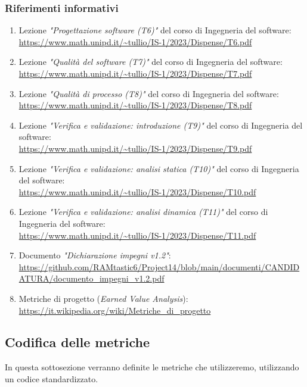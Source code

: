 \subsubsection{Riferimenti informativi}
\label{sec:rif_inf}
\begin{enumerate}
    \item Lezione \emph{"Progettazione software (T6)"} del corso di Ingegneria del software: \\
    \url{https://www.math.unipd.it/~tullio/IS-1/2023/Dispense/T6.pdf}
    \item Lezione \emph{"Qualità del software (T7)"} del corso di Ingegneria del software: \\
    \url{https://www.math.unipd.it/~tullio/IS-1/2023/Dispense/T7.pdf}
    \item Lezione \emph{"Qualità di processo (T8)"} del corso di Ingegneria del software: \\
    \url{https://www.math.unipd.it/~tullio/IS-1/2023/Dispense/T8.pdf}
    \item Lezione \emph{"Verifica e validazione: introduzione (T9)"} del corso di Ingegneria del software: \\
    \url{https://www.math.unipd.it/~tullio/IS-1/2023/Dispense/T9.pdf}
    \item Lezione \emph{"Verifica e validazione: analisi statica (T10)"} del corso di Ingegneria del software: \\
    \url{https://www.math.unipd.it/~tullio/IS-1/2023/Dispense/T10.pdf}
    \item Lezione \emph{"Verifica e validazione: analisi dinamica (T11)"} del corso di Ingegneria del software: \\
    \url{https://www.math.unipd.it/~tullio/IS-1/2023/Dispense/T11.pdf}
     \item Documento \emph{"Dichiarazione impegni v1.2"}: \\ \url{https://github.com/RAMtastic6/Project14/blob/main/documenti/CANDIDATURA/documento_impegni_v1.2.pdf}
     \item Metriche di progetto (\emph{Earned Value Analysis}):\\
     \url{https://it.wikipedia.org/wiki/Metriche_di_progetto}
\end{enumerate}
\subsection{Codifica delle metriche}
In questa sottosezione verranno definite le metriche che utilizzeremo, utilizzando un codice standardizzato.

